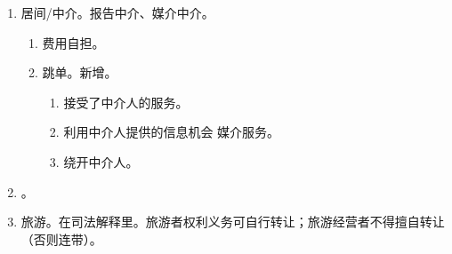 \begin{enumerate}
\begin{enumerate}
          \item 行纪人瑕疵担保责任。合同相对性。。
          \item vs 商事合同。
        \end{enumerate}
  \item 居间/中介。报告中介、媒介中介。
        \begin{enumerate}
          \item 费用自担。
          \item 跳单。新增。
                \begin{enumerate}
                  \item 接受了中介人的服务。
                  \item 利用中介人提供的信息机会 \hz 媒介服务。
                  \item 绕开中介人。
                \end{enumerate}
        \end{enumerate}
  \item {}。
  \item 旅游。在司法解释里。旅游者权利义务可自行转让；旅游经营者不得擅自转让（否则连带）。
\end{enumerate}
